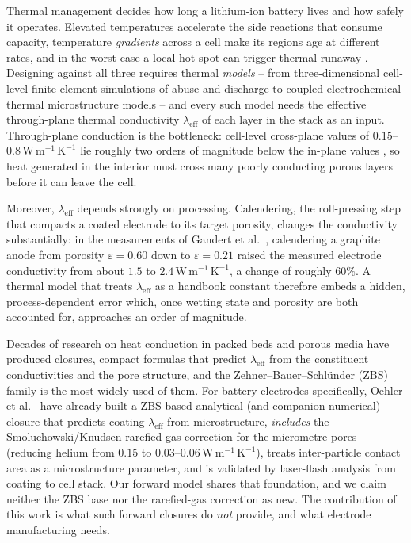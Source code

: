 \documentclass[10pt,a4paper]{article}
\newcommand{\leff}{\lambda_{\mathrm{eff}}}
\newcommand{\WmK}{\,\mathrm{W\,m^{-1}\,K^{-1}}}
\begin{document}
Thermal management decides how long a lithium-ion battery lives and how safely it operates. Elevated temperatures accelerate the side reactions that consume capacity, temperature \emph{gradients} across a cell make its regions age at different rates, and in the worst case a local hot spot can trigger thermal runaway \cite{bandhauer2011,richter2017}. Designing against all three requires thermal \emph{models} -- from three-dimensional cell-level finite-element simulations of abuse and discharge \cite{guo2010,jeon2011,yue2017} to coupled electrochemical-thermal microstructure models \cite{chen2017} -- and every such model needs the effective through-plane thermal conductivity $\leff$ of each layer in the stack as an input. Through-plane conduction is the bottleneck: cell-level cross-plane values of $0.15$--$0.8\WmK$ lie roughly two orders of magnitude below the in-plane values \cite{richter2017,steinhardt2022}, so heat generated in the interior must cross many poorly conducting porous layers before it can leave the cell.

Moreover, $\leff$ depends strongly on processing. Calendering, the roll-pressing step that compacts a coated electrode to its target porosity, changes the conductivity substantially: in the measurements of Gandert et al.\ \cite{gandert2023}, calendering a graphite anode from porosity $\varepsilon=0.60$ down to $\varepsilon=0.21$ raised the measured electrode conductivity from about $1.5$ to $2.4\WmK$, a change of roughly $60\%$. A thermal model that treats $\leff$ as a handbook constant therefore embeds a hidden, process-dependent error which, once wetting state and porosity are both accounted for, approaches an order of magnitude.

Decades of research on heat conduction in packed beds and porous media have produced closures, compact formulas that predict $\leff$ from the constituent conductivities and the pore structure, and the Zehner--Bauer--Schl\"under (ZBS) family \cite{zehner1970,bauer1978,vdi} is the most widely used of them. For battery electrodes specifically, Oehler et al.\ \cite{oehler2021,oehlerdiss} have already built a ZBS-based analytical (and companion numerical) closure that predicts coating $\leff$ from microstructure, \emph{includes} the Smoluchowski/Knudsen rarefied-gas correction for the micrometre pores (reducing helium from $0.15$ to $0.03$--$0.06\WmK$), treats inter-particle contact area as a microstructure parameter, and is validated by laser-flash analysis from coating to cell stack. Our forward model shares that foundation, and we claim neither the ZBS base nor the rarefied-gas correction as new. The contribution of this work is what such forward closures do \emph{not} provide, and what electrode manufacturing needs.
\end{document}
